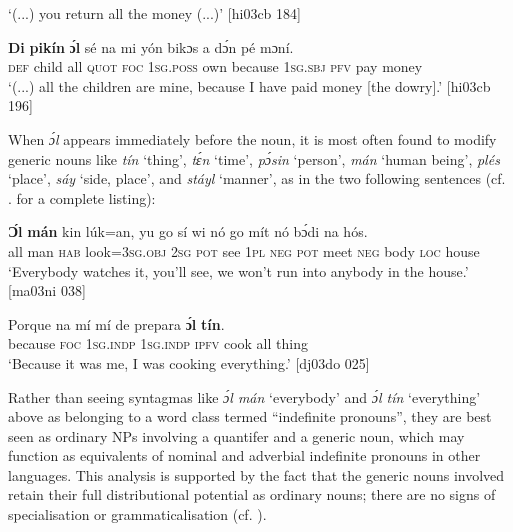 \glt ‘(...) you return all the money (...)’ [hi03cb 184]
\z


\ea%
    \label{ex:key:260}
    \gll \textbf{Di} \textbf{  pikín} \textbf{  ɔ́l}  sé    na  mi    yón   bikɔs
a    dɔ́n  pé  mɔní.\\
\textsc{def}  child  all  \textsc{quot}  \textsc{foc}  \textsc{1sg.poss}  own  because
\textsc{1sg.sbj}  \textsc{pfv}  pay  money\\

\glt ‘(...) all the children are mine, because I have paid money [the dowry].’ [hi03cb 196]
\z

When \textit{ɔ́l} appears immediately before the noun, it is most often found to modify generic noun{\fff}s like \textit{tín} ‘thing’, \textit{tɛ́n} ‘time’, \textit{pɔ́sin} ‘person’, \textit{mán} ‘human being’, \textit{plés} ‘place’, \textit{sáy} ‘side, place’, and \textit{stáyl} ‘manner’, as in the two following sentences (cf. . for a complete listing):


\ea%
    \label{ex:key:261}
    \gll \textbf{Ɔ́l} \textbf{  mán}  kin  lúk=an,    yu  go  sí  wi  nó  go
mít    nó  bɔ́di    na  hós.\\
all  man    \textsc{hab}  look=\textsc{3sg.obj}  \textsc{2sg}  \textsc{pot}  see  \textsc{1pl}  \textsc{neg}  \textsc{pot}
meet  \textsc{neg}  body  \textsc{loc}  house\\

\glt ‘Everybody watches it, you’ll see, we won’t run into anybody 
in the house.’ [ma03ni 038]
\z


\ea%
    \label{ex:key:262}
    \gll Porque  na  mí    mí    de  prepara  \textbf{ɔ́l  } \textbf{tín}.\\
because  \textsc{foc}  \textsc{1sg.indp}  \textsc{1sg.indp}  \textsc{ipfv}  cook  all  thing\\

\glt ‘Because it was me, I was cooking everything.’ [dj03do 025]
\z

Rather than seeing syntagmas like \textit{ɔ́l mán} ‘everybody’ and \textit{ɔ́l tín} ‘everything’ above as belonging to a word class termed “indefinite pronouns”, they are best seen as ordinary NPs involving a quantifer and a generic noun, which may function as equivalents of nominal and adverbial indefinite pronouns in other languages. This analysis is supported by the fact that the generic nouns involved retain their full distributional potential as ordinary nouns; there are no signs of specialisation or grammaticalisation (cf. \citealt[182–183]{Haspelmath1994}).


